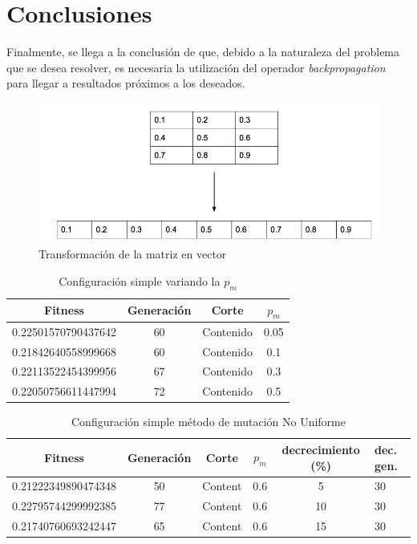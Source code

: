 \documentclass{sig-alternate}
\begin{document}
\section{Conclusiones}
Finalmente, se llega a la conclusión de que, debido a la naturaleza del problema que se desea resolver,
 es necesaria la utilización del operador \textit{backpropagation} 
para llegar a resultados próximos a los deseados. 
\onecolumn
\begin{figure}[ht]
		\includegraphics[scale=0.5]{./figures/matrix_to_array.png}
  		\caption{Transformación de la matriz en vector}
  		\label{fig:indiv}
	\end{figure}

\begin{table}[htp]
	\begin{center}
	\begin{tabular}{|c|c|c|c|}
		\hline
	     Fitness & Generación & Corte & $p_{m}$ \\
		\hline
		0.22501570790437642 & 60 & Contenido & 0.05 \\
		0.21842640558999668 & 60 & Contenido & 0.1 \\
		0.22113522454399956 & 67 & Contenido & 0.3 \\ 
		0.22050756611447994 & 72 & Contenido & 0.5 \\
		\hline
	\end{tabular}
	\caption{Configuración simple variando la $p_m$}
	\label{table:simple_mutation_prob}
	\end{center}
\end{table}

\begin{table}[htp]
	\begin{center}
	\begin{tabular}{|c|c|c|c|c|p{1cm}|}
		\hline
	     Fitness & Generación & Corte & $p_{m}$ & decrecimiento (\%) & dec. gen. \\
		\hline
		0.21222349890474348 & 50 & Content & 0.6 & 5 & 30 \\
		0.22795744299992385 & 77 & Content & 0.6 & 10  & 30 \\
		0.21740760693242447 & 65 & Content & 0.6 & 15 & 30 \\
		\hline
	\end{tabular}
	\caption{Configuración simple método de mutación No Uniforme}
	\label{table:simple_mutation_no_uniform}
	\end{center}
\end{table}
\end{document}
